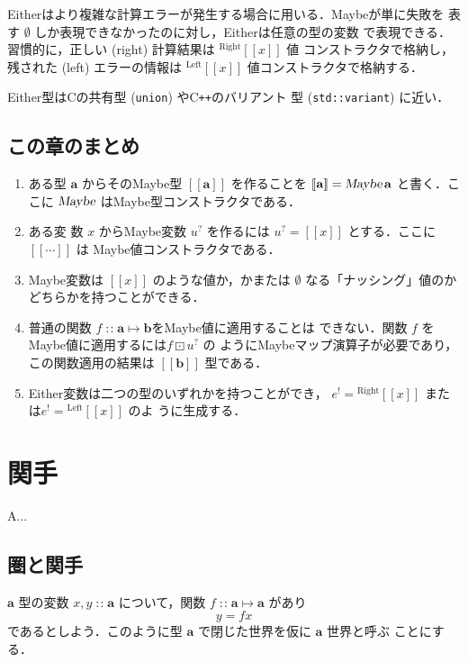 \documentclass[a5paper,twoside,fleqn,draft]{jsbook}
\def\[{[\![}
\def\]{]\!]}
\newcommand{\programminglanguage}[1]{\textsf{#1}}
\newcommand{\clang}{\programminglanguage{C}}
\newcommand{\cxx}{\programminglanguage{C}\texttt{++}}
\newenvironment{leader}{\begingroup\gt}{\endgroup}
\newcommand{\code}[1]{\texttt{#1}}
\newcommand{\mNothing}{\emptyset}
\DeclareMathOperator{\mIn}{{:\!:}}
\DeclareMathOperator{\mMapMaybe}{\boxdot}
\DeclareMathOperator{\mMapsTo}{\mapsto}
\newcommand{\mType}[1]{\mathbf{#1}} %
\newcommand{\mA}{\mType{a}}
\newcommand{\mB}{\mType{b}}
\newcommand{\mTypeAssemble}[2]{{}^{\mType{#1}}\[\mType{#2}\]}
\newcommand{\mMaybeType}[1]{\[\mType{#1}\]}%
\newcommand{\mTypeConstructor}[1]{\textsl{#1}}
\DeclareMathOperator{\mMaybeTypeConstructor}{\mTypeConstructor{Maybe}}
\newcommand{\mValueConstructor}[1]{\mathrm{#1}}
\newcommand{\mValueWith}[2]{{}^\mValueConstructor{#1}\[#2\]}
\newcommand{\mLeftWith}[1]{\mValueWith{Left}{#1}}
\newcommand{\mRightWith}[1]{\mValueWith{Right}{#1}}
\newcommand{\mJustWith}[1]{\[#1\]}%
\newcommand{\mEither}[1]{{#1}^!}
\newcommand{\mMaybe}[1]{{#1}^?}
\newcommand{\mProjEXP}[2]{#1\mMapsTo#2} %
\begin{document}
Eitherはより複雑な計算エラーが発生する場合に用いる．Maybeが単に失敗を
表す $\mNothing$ しか表現できなかったのに対し，Eitherは任意の型の変数
で表現できる．習慣的に，正しい (right) 計算結果は $\mRightWith{x}$ 値
コンストラクタで格納し，残された (left) エラーの情報は $\mLeftWith{x}$
値コンストラクタで格納する．

Either型は\clang の共有型 (\code{union}) や\cxx のバリアント
型 (\code{std::variant}) に近い．

\section{この章のまとめ}

\begin{enumerate}
\item ある型 $\mA $ からそのMaybe型 $\mMaybeType{a}$ を作ることを
  $\mMaybeType{a}=\mMaybeTypeConstructor\mA $ と書く．ここに
  $\mMaybeTypeConstructor$ はMaybe型コンストラクタである．\item ある変
  数 $x$ からMaybe変数 $\mMaybe{u}$ を作るには
  $\mMaybe{u}=\mJustWith{x}$ とする．ここに $\mJustWith{\dotsb}$ は
  Maybe値コンストラクタである．
\item Maybe変数は $\mJustWith{x}$ のような値か，かまたは $\mNothing$
  なる「ナッシング」値のかどちらかを持つことができる．
\item 普通の関数 $f\mIn\mProjEXP{\mA }{\mB }$をMaybe値に適用することは
  できない．関数 $f$ をMaybe値に適用するには$f\mMapMaybe\mMaybe{u}$ の
  ようにMaybeマップ演算子が必要であり，この関数適用の結果は
  $\mMaybeType{b}$ 型である．
\item Either変数は二つの型のいずれかを持つことができ，
  $\mEither{e}=\mRightWith{x}$ または$\mEither{e}=\mLeftWith{x}$ のよ
  うに生成する．
\end{enumerate}

\chapter{関手}
\label{ch:functor}

\begin{leader}
A...
\end{leader}

\section{圏と関手}

$\mA $ 型の変数 $x,y\mIn\mA$ について，関数 $f\mIn\mA\mMapsTo\mA$ があり
\begin{equation}
  y
  =fx
\end{equation}
であるとしよう．このように型 $\mA$ で閉じた世界を仮に $\mA$ 世界と呼ぶ
ことにする．
\end{document}
